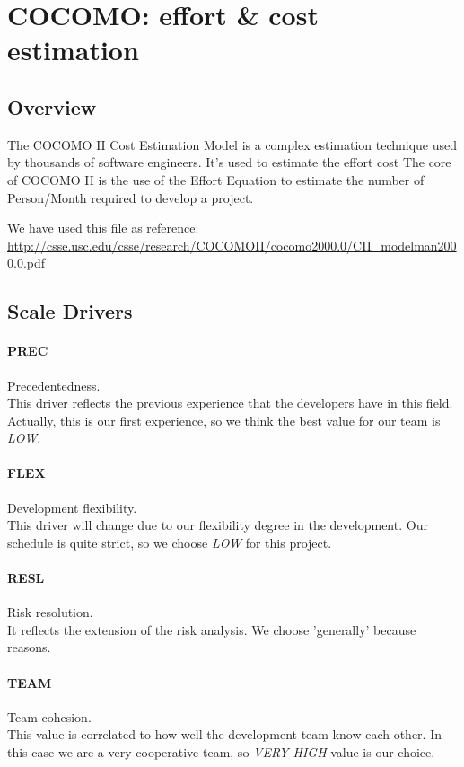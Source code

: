\section{COCOMO: effort \& cost estimation}
\subsection{Overview} %
\label{sub:cocomo_overview}
The COCOMO II Cost Estimation Model is a complex estimation technique used 
by thousands of software engineers. It's used to estimate the effort cost
The core of COCOMO II is the use of the Effort Equation to estimate the number
of Person/Month required to develop a project.

We have used this file as reference: \\ 
\url{http://csse.usc.edu/csse/research/COCOMOII/cocomo2000.0/CII_modelman2000.0.pdf}

\subsection{Scale Drivers} %
\label{sub:scale_drivers}

\paragraph{PREC} Precedentedness. \\ 
This driver reflects the previous experience that the developers have in this 
field. Actually, this is our first experience, so we think the best value for
our team is \emph{LOW}.

\paragraph{FLEX} Development flexibility. \\
This driver will change due to our flexibility degree in the development.
Our schedule is quite strict, so we choose \emph{LOW} for this project.

\paragraph{RESL} Risk resolution. \\
It reflects the extension of the risk analysis. We choose 'generally'
because reasons.

\paragraph{TEAM} Team cohesion. \\
This value is correlated to how well the development team know each other. 
In this case we are a very cooperative team, so \emph{VERY HIGH} value is
our choice.

